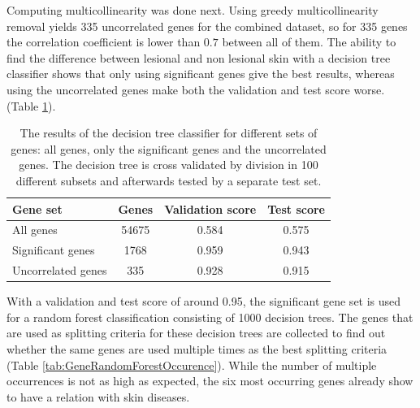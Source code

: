 \documentclass[10pt,a4paper]{article}
\begin{document}
	
	Computing multicollinearity was done next. Using greedy multicollinearity removal yields 335 uncorrelated genes for the combined dataset, so for 335 genes the correlation coefficient is lower than $0.7$ between all of them. The ability to find the difference between lesional and non lesional skin with a decision tree classifier shows that only using significant genes give the best results, whereas using the uncorrelated genes make both the validation and test score worse. (Table \ref{tab:DecisionTreeResults}).
	
	\begin{table}[H]
		\centering
		\caption{The results of the decision tree classifier for different sets of genes: all genes, only the significant genes and the uncorrelated genes. The decision tree is cross validated by division in 100 different subsets and afterwards tested by a separate test set.}
		\label{tab:DecisionTreeResults}
		\begin{tabular}{l|ccc}
			\textbf{Gene set}                                            & \textbf{Genes} & \textbf{Validation score} & \textbf{Test score} \\ \hline
			All genes                                                    & 54675             & 0.584                     & 0.575               \\
			Significant genes                                            & 1768              & 0.959                     & 0.943               \\
			Uncorrelated genes & 335               & 0.928                     & 0.915              
		\end{tabular}
	\end{table}
	
	With a validation and test score of around 0.95, the significant gene set is used for a random forest classification consisting of 1000 decision trees. The genes that are used as splitting criteria for these decision trees are collected to find out whether the same genes are used multiple times as the best splitting criteria (Table \ref{tab:GeneRandomForestOccurence}). While the number of multiple occurrences is not as high as expected, the six most occurring genes already show to have a relation with skin diseases. 
	
\end{document}
